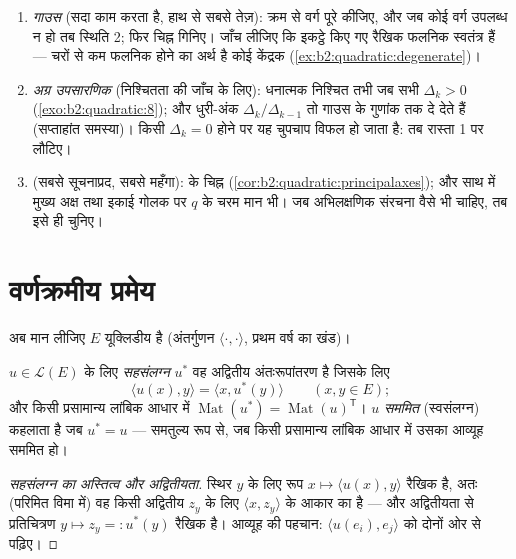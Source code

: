 \begin{method}[चिह्नांक परिकलित करना: तीन रास्ते]\label{met:b2:quadratic:signature}
\begin{enumerate}
  \item \emph{गाउस} (सदा काम करता है, हाथ से सबसे तेज़): क्रम से वर्ग
        पूरे कीजिए, और जब कोई वर्ग उपलब्ध न हो तब स्थिति 2; फिर चिह्न
        गिनिए। जाँच लीजिए कि इकट्ठे किए गए रैखिक फलनिक स्वतंत्र हैं ---
        चरों से कम फलनिक होने का अर्थ है कोई केंद्रक (\cref{ex:b2:quadratic:degenerate})।
  \item \emph{अग्र उपसारणिक} (निश्चितता की जाँच के लिए): धनात्मक निश्चित
        तभी जब सभी $\Delta_k > 0$ (\cref{exo:b2:quadratic:8}); और धुरी-अंक $\Delta_k/\Delta_{k-1}$ तो गाउस के गुणांक तक दे
        देते हैं (सप्ताहांत समस्या)। किसी $\Delta_k = 0$ होने पर यह चुपचाप विफल हो
        जाता है: तब रास्ता 1 पर लौटिए।
  \item \emph{} (सबसे सूचनाप्रद, सबसे महँगा):  के
        चिह्न (\cref{cor:b2:quadratic:principalaxes}); और साथ में मुख्य अक्ष तथा इकाई गोलक पर $q$ के चरम
        मान भी। जब अभिलक्षणिक संरचना वैसे भी चाहिए, तब इसे ही चुनिए।
\end{enumerate}
\end{method}

\section{वर्णक्रमीय प्रमेय}

अब मान लीजिए $E$ यूक्लिडीय है (अंतर्गुणन $\langle\cdot,\cdot\rangle$, प्रथम वर्ष का खंड)।

\begin{definition}\label{def:b2:quadratic:adjoint}
$u \in \mathcal{L}(E)$ के लिए \emph{सहसंलग्न} $u^*$ वह अद्वितीय अंतःरूपांतरण
है जिसके लिए
\[
\langle u(x), y\rangle = \langle x, u^*(y)\rangle
\qquad (x, y \in E);
\]
और किसी प्रसामान्य लांबिक आधार में $\operatorname{Mat}(u^*) =
\operatorname{Mat}(u)^{\mathsf T}$। $u$
\emph{सममित} (स्वसंलग्न) कहलाता है जब $u^* = u$ ---
समतुल्य रूप से, जब किसी प्रसामान्य लांबिक आधार में उसका आव्यूह सममित हो।
\end{definition}

\begin{proof}[सहसंलग्न का अस्तित्व और अद्वितीयता]
स्थिर $y$ के लिए रूप $x \mapsto \langle u(x), y\rangle$ रैखिक है, अतः (परिमित विमा में) वह किसी अद्वितीय
$z_y$ के लिए $\langle x,
z_y\rangle$ के आकार का है --- और अद्वितीयता से प्रतिचित्रण $y \mapsto z_y =:
u^*(y)$ रैखिक
है। आव्यूह की पहचान: $\langle u(e_i), e_j\rangle$ को दोनों ओर से पढ़िए।
\end{proof}

